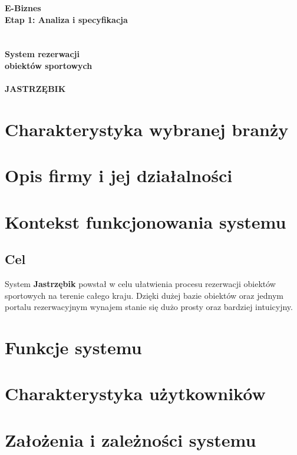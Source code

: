 \documentclass[a4paper,11pt]{article}
\begin{document}
\begin{titlepage}
\begin{center}
\textbf{\huge{E-Biznes}}
\textbf{\LARGE{\\Etap 1: Analiza i specyfikacja}}
\textbf{\Huge{\\~\\~\\System rezerwacji\\obiektów sportowych\\~\\ JASTRZĘBIK}} 
\end{center}

\end{titlepage}

\setcounter{page}{2}

\tableofcontents
\newpage

\section{Charakterystyka wybranej branży}

\section{Opis firmy i jej działalności}

\section{Kontekst funkcjonowania systemu}

\subsection{Cel}

System \textbf{Jastrzębik} powstał w celu ułatwienia procesu rezerwacji obiektów sportowych na terenie całego kraju. Dzięki dużej bazie obiektów oraz jednym portalu rezerwacyjnym wynajem stanie się dużo prosty oraz bardziej intuicyjny. 

\section{Funkcje systemu}

\section{Charakterystyka użytkowników}

\section{Założenia i zależności systemu}
\end{document}
